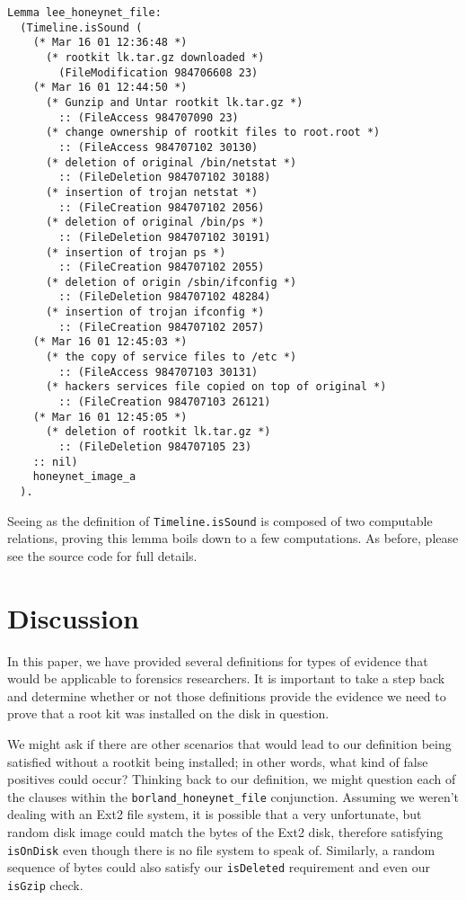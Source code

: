 \documentclass[nocopyrightspace]{sigplanconf}
\begin{document}
\begin{lstlisting}
Lemma lee_honeynet_file:
  (Timeline.isSound (
    (* Mar 16 01 12:36:48 *)
      (* rootkit lk.tar.gz downloaded *)
        (FileModification 984706608 23)
    (* Mar 16 01 12:44:50 *)
      (* Gunzip and Untar rootkit lk.tar.gz *)
        :: (FileAccess 984707090 23)
      (* change ownership of rootkit files to root.root *)
        :: (FileAccess 984707102 30130)
      (* deletion of original /bin/netstat *)
        :: (FileDeletion 984707102 30188)
      (* insertion of trojan netstat *)
        :: (FileCreation 984707102 2056) 
      (* deletion of original /bin/ps *)
        :: (FileDeletion 984707102 30191)
      (* insertion of trojan ps *)
        :: (FileCreation 984707102 2055) 
      (* deletion of origin /sbin/ifconfig *)
        :: (FileDeletion 984707102 48284)
      (* insertion of trojan ifconfig *)
        :: (FileCreation 984707102 2057) 
    (* Mar 16 01 12:45:03 *)
      (* the copy of service files to /etc *)
        :: (FileAccess 984707103 30131)  
      (* hackers services file copied on top of original *)
        :: (FileCreation 984707103 26121)
    (* Mar 16 01 12:45:05 *)
      (* deletion of rootkit lk.tar.gz *)
        :: (FileDeletion 984707105 23)   
    :: nil)
    honeynet_image_a
  ).
\end{lstlisting}

Seeing as the definition of {\tt Timeline.isSound} is composed of two
computable relations, proving this lemma boils down to a few computations. As
before, please see the source code for full details.

\section{Discussion}
In this paper, we have provided several definitions for types of evidence that
would be applicable to forensics researchers. It is important to take a step
back and determine whether or not those definitions provide the evidence we
need to prove that a root kit was installed on the disk in question. 

We might ask if there are other scenarios that would lead to our definition
being satisfied without a rootkit being installed; in other words, what kind
of false positives could occur? Thinking back to our definition, we might
question each of the clauses within the {\tt borland\_honeynet\_file}
conjunction. Assuming we weren't dealing with an Ext2 file system, it is
possible that a very unfortunate, but random disk image could match the bytes
of the Ext2 disk, therefore satisfying {\tt isOnDisk} even though there is no
file system to speak of. Similarly, a random sequence of bytes could also
satisfy our {\tt isDeleted} requirement and even our {\tt isGzip} check.
\end{document}

